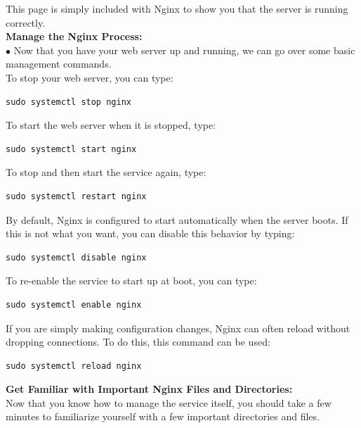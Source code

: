 \documentclass[journal,12pt,onecolumn]{IEEEtran}
\begin{document}
\begin{flushleft}
\begin{enumerate}
This page is simply included with Nginx to show you that the server is running correctly.\\
\medskip
\textbf{Manage the Nginx Process:} \\
$\bullet$ Now that you have your web server up and running, we can go over some basic management commands.\\
\medskip
To stop your web server, you can type:\\
\medskip
\begin{lstlisting}[frame=single,linewidth=7cm,breaklines=true]
sudo systemctl stop nginx
\end{lstlisting}
\bigskip
\medskip
To start the web server when it is stopped, type:\\
\medskip
\begin{lstlisting}[frame=single,linewidth=10cm,breaklines=true]
sudo systemctl start nginx
\end{lstlisting}
\bigskip
\medskip
To stop and then start the service again, type:\\
\medskip
\begin{lstlisting}[frame=single,linewidth=10cm,breaklines=true]
sudo systemctl restart nginx
\end{lstlisting}
\bigskip
\medskip
By default, Nginx is configured to start automatically when the server boots. If this is not what you want, you can disable this behavior by typing: \\
\medskip
\begin{lstlisting}[frame=single,linewidth=10cm,breaklines=true]
sudo systemctl disable nginx
\end{lstlisting}
\bigskip
\medskip
To re-enable the service to start up at boot, you can type:\\
\medskip
\begin{lstlisting}[frame=single,linewidth=10cm,breaklines=true]
sudo systemctl enable nginx
\end{lstlisting}
\bigskip
\medskip
If you are simply making configuration changes, Nginx can often reload without dropping connections. To do this, this command can be used:\\
\medskip
\begin{lstlisting}[frame=single,linewidth=9cm,breaklines=true]
sudo systemctl reload nginx
\end{lstlisting}
\bigskip

\textbf{Get Familiar with Important Nginx Files and Directories:} \\
Now that you know how to manage the service itself, you should take a few minutes to familiarize yourself with a few important directories and files.\\


\end{enumerate}
\end{flushleft}
\end{document}
